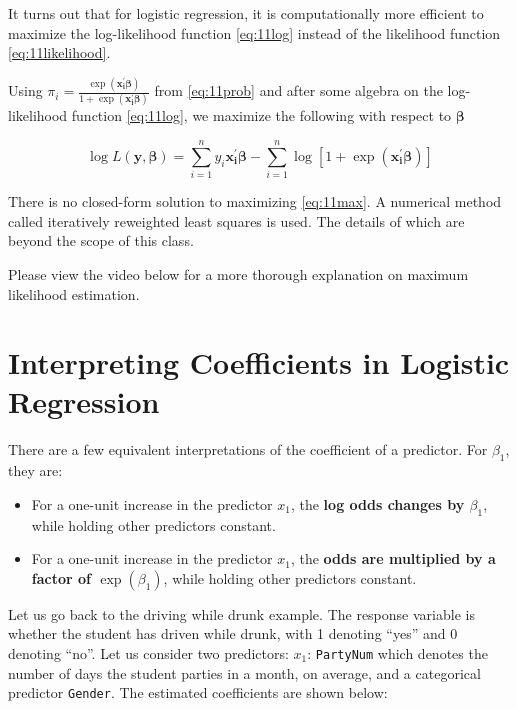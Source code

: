 \documentclass[
]{book}
\providecommand{\tightlist}{%
  \setlength{\itemsep}{0pt}\setlength{\parskip}{0pt}}
\begin{document}
It turns out that for logistic regression, it is computationally more efficient to maximize the log-likelihood function \eqref{eq:11log} instead of the likelihood function \eqref{eq:11likelihood}.

Using \(\pi_i=\frac{\exp(\boldsymbol{x_i^{\prime}\beta})}{1 + \exp(\boldsymbol{x_i^{\prime}\beta})}\) from \eqref{eq:11prob} and after some algebra on the log-likelihood function \eqref{eq:11log}, we maximize the following with respect to \(\boldsymbol{\beta}\)

\begin{equation} 
\log L(\boldsymbol{y}, \boldsymbol{\beta}) = \sum_{i=1}^n y_i \boldsymbol{x_i^{\prime}\beta} - \sum_{i=1}^n \log [ 1 + \exp(\boldsymbol{x_i^{\prime}\beta}) ]
\label{eq:11max}
\end{equation}

There is no closed-form solution to maximizing \eqref{eq:11max}. A numerical method called iteratively reweighted least squares is used. The details of which are beyond the scope of this class.

Please view the video below for a more thorough explanation on maximum likelihood estimation.

\hypertarget{interpreting-coefficients-in-logistic-regression}{%
\section{Interpreting Coefficients in Logistic Regression}\label{interpreting-coefficients-in-logistic-regression}}

There are a few equivalent interpretations of the coefficient of a predictor. For \(\beta_1\), they are:

\begin{itemize}
\tightlist
\item
  For a one-unit increase in the predictor \(x_1\), the \textbf{log odds changes by \(\beta_1\)}, while holding other predictors constant.
\item
  For a one-unit increase in the predictor \(x_1\), the \textbf{odds are multiplied by a factor of \(\exp(\beta_1)\)}, while holding other predictors constant.
\end{itemize}

Let us go back to the driving while drunk example. The response variable is whether the student has driven while drunk, with 1 denoting ``yes'' and 0 denoting ``no''. Let us consider two predictors: \(x_1\): \texttt{PartyNum} which denotes the number of days the student parties in a month, on average, and a categorical predictor \texttt{Gender}. The estimated coefficients are shown below:
\end{document}

